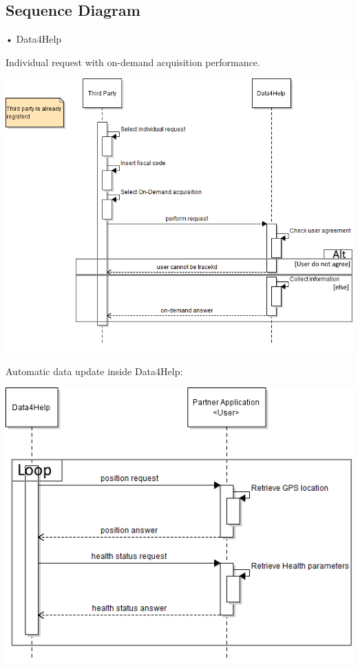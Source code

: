 \subsection{Sequence Diagram}
\begin{enumerate}
\begin{minipage}{\textwidth}
\FloatBarrier
\item[•]{\Large Data4Help}


Individual request with on-demand acquisition performance.
\begin{center}
\includegraphics[scale=0.8]{Images/Seq_Data4Help_onDem.png}
\end{center}
\FloatBarrier

\FloatBarrier
Automatic data update inside Data4Help:
\begin{center}
\includegraphics[scale=0.8]{Images/Seq_Data4Help_autoUp.png}
\end{center}
\FloatBarrier


\end{minipage}
\end{enumerate}
